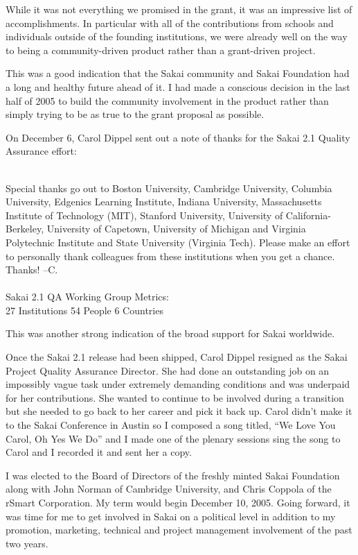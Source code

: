 \documentclass[12pt]{book}
\begin{document}
While it was not everything we promised in the grant, it
was an impressive list of accomplishments.  In particular
with all of the contributions from schools and individuals
outside of the founding institutions, we were already well
on the way to being a community-driven product rather than
a grant-driven project.

This was a good indication that the Sakai community
and Sakai Foundation had a long and healthy future
ahead of it.  I had made a conscious decision in the last
half of 2005 to build the community involvement in the
product rather than simply trying to be as true to the
grant proposal as possible.

On December 6, Carol Dippel sent out a note of thanks for
the Sakai 2.1 Quality Assurance effort:\\
\\
\begin{sf}
Special thanks go out to Boston University,
Cambridge University, Columbia University, Edgenics
Learning Institute, Indiana University, Massachusetts
Institute of Technology (MIT), Stanford University,
University of California-Berkeley, University of Capetown,
University of Michigan and Virginia Polytechnic Institute and
State University (Virginia Tech). Please make an effort to
personally thank colleagues from these institutions when
you get a chance. Thanks! --C.\\
\\
Sakai 2.1 QA Working Group Metrics:\\
27 Institutions 54 People 6 Countries\\
\end{sf}

This was another strong indication of the broad
support for Sakai worldwide.

Once the Sakai 2.1 release had been shipped, Carol Dippel
resigned as the Sakai Project Quality Assurance Director.
She had done an outstanding job on an impossibly vague
task under extremely demanding conditions and was
underpaid for her contributions.  She wanted to continue
to be involved during a transition but she needed to go
back to her career and pick it back up. Carol didn't
make it to the Sakai Conference in Austin so I composed
a song titled, ``We Love You Carol, Oh Yes We Do'' and
I made one of the plenary sessions sing the song to Carol
and I recorded it and sent her a copy.

I was elected to the Board of Directors of the freshly minted
Sakai Foundation
along with John Norman of Cambridge University, and Chris
Coppola of the rSmart Corporation.  My term would begin
December 10, 2005.   Going forward, it was
time for me to get involved in Sakai on a political level
in addition to my promotion, marketing, technical and project
management involvement of the past two years.
\end{document}

